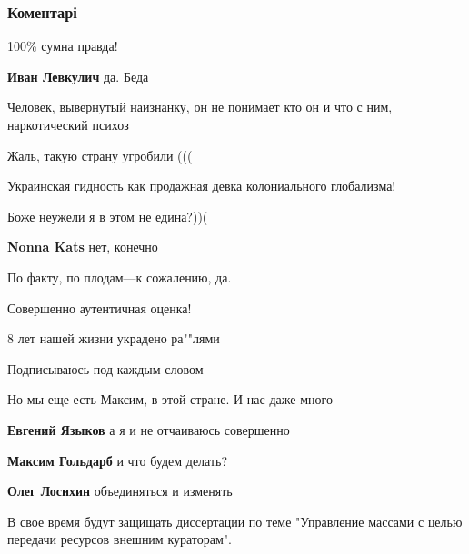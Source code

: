  
 
 
 
 
\subsubsection{Коментарі}

\begin{itemize} %
100\% сумна правда!

\textbf{Иван Левкулич} да. Беда

Человек, вывернутый наизнанку, он не понимает кто он и что с ним, наркотический психоз

Жаль, такую страну угробили (((

Украинская гидность как продажная девка колониального глобализма!

Боже неужели я в этом не едина?))(

\textbf{Nonna Kats} нет, конечно

По факту, по плодам—к сожалению, да.

Совершенно аутентичная оценка!

8 лет нашей жизни украдено ра""лями

Подписываюсь под каждым словом

Но мы еще есть Максим, в этой стране.
И нас даже много

\begin{itemize} %
\textbf{Евгений Языков} а я и не отчаиваюсь совершенно

\textbf{Максим Гольдарб} и что будем делать?

\textbf{Олег Лосихин} объединяться и изменять
\end{itemize} %

В свое время будут защищать диссертации по теме "Управление массами с целью передачи ресурсов внешним кураторам".


\end{itemize}
